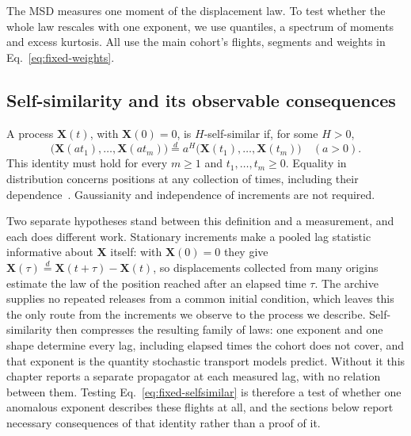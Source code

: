 The MSD measures one moment of the displacement law. To test whether the whole law
rescales with one exponent, we use quantiles, a spectrum of moments and excess kurtosis.
All use the main cohort's flights, segments and weights in Eq.~\eqref{eq:fixed-weights}.

\subsection{Self-similarity and its observable consequences}
\label{sec:fixed-selfsimilar-definition}

A process $\boldsymbol X(t)$, with $\boldsymbol X(0)=0$, is $H$-self-similar if,
for some $H>0$,
\begin{equation}
 \bigl(\boldsymbol X(at_1),\ldots,\boldsymbol X(at_m)\bigr)
 \overset d= a^H\bigl(\boldsymbol X(t_1),\ldots,\boldsymbol X(t_m)\bigr)
 \quad(a>0).
 \label{eq:fixed-selfsimilar}
\end{equation}
This identity must hold for every $m\geq1$ and $t_1,\ldots,t_m\geq0$.
Equality in distribution concerns positions at any collection of times, including
their dependence~\cite{embrechts_maejima_selfsimilar}. Gaussianity and independence
of increments are not required.

Two separate hypotheses stand between this definition and a measurement, and each
does different work. Stationary increments make a pooled lag statistic informative
about $\boldsymbol X$ itself: with $\boldsymbol X(0)=0$ they give
$\boldsymbol X(\tau)\overset d=\boldsymbol X(t+\tau)-\boldsymbol X(t)$, so
displacements collected from many origins estimate the law of the position reached
after an elapsed time $\tau$. The archive supplies no repeated releases from a common
initial condition, which leaves this the only route from the increments we observe
to the process we describe. Self-similarity then compresses the resulting family of
laws: one exponent and one shape determine every lag, including elapsed times the
cohort does not cover, and that exponent is the quantity stochastic transport
models predict. Without it this chapter reports a separate
propagator at each measured lag, with no relation between them. Testing
Eq.~\eqref{eq:fixed-selfsimilar} is therefore a test of whether one anomalous
exponent describes these flights at all, and the sections below report necessary
consequences of that identity rather than a proof of it.

